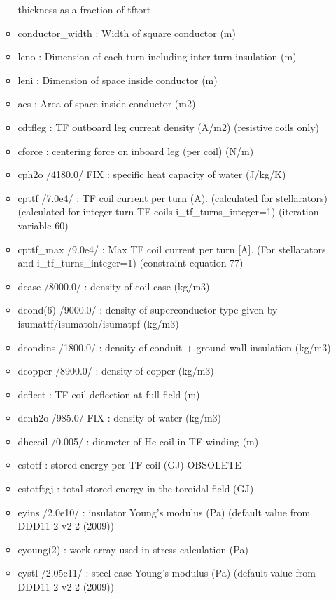 \documentclass[]{article}
\begin{document}
\begin{itemize}
\begin{itemize}
    thickness as a fraction of tftort
  \item
    conductor\_width : Width of square conductor (m)
  \item
    leno : Dimension of each turn including inter-turn insulation (m)
  \item
    leni : Dimension of space inside conductor (m)
  \item
    acs : Area of space inside conductor (m2)
  \item
    cdtfleg : TF outboard leg current density (A/m2) (resistive coils
    only)
  \item
    cforce : centering force on inboard leg (per coil) (N/m)
  \item
    cph2o /4180.0/ FIX : specific heat capacity of water (J/kg/K)
  \item
    cpttf /7.0e4/ : TF coil current per turn (A). (calculated for
    stellarators) (calculated for integer-turn TF coils
    i\_tf\_turns\_integer=1) (iteration variable 60)
  \item
    cpttf\_max /9.0e4/ : Max TF coil current per turn {[}A{]}. (For
    stellarators and i\_tf\_turns\_integer=1) (constraint equation 77)
  \item
    dcase /8000.0/ : density of coil case (kg/m3)
  \item
    dcond(6) /9000.0/ : density of superconductor type given by
    isumattf/isumatoh/isumatpf (kg/m3)
  \item
    dcondins /1800.0/ : density of conduit + ground-wall insulation
    (kg/m3)
  \item
    dcopper /8900.0/ : density of copper (kg/m3)
  \item
    deflect : TF coil deflection at full field (m)
  \item
    denh2o /985.0/ FIX : density of water (kg/m3)
  \item
    dhecoil /0.005/ : diameter of He coil in TF winding (m)
  \item
    estotf : stored energy per TF coil (GJ) OBSOLETE
  \item
    estotftgj : total stored energy in the toroidal field (GJ)
  \item
    eyins /2.0e10/ : insulator Young's modulus (Pa) (default value from
    DDD11-2 v2 2 (2009))
  \item
    eyoung(2) : work array used in stress calculation (Pa)
  \item
    eystl /2.05e11/ : steel case Young's modulus (Pa) (default value
    from DDD11-2 v2 2 (2009))

\end{itemize}
\end{itemize}
\end{document}
